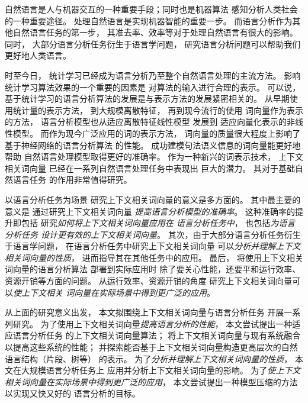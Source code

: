 自然语言是人与机器交互的一种重要手段；同时也是机器算法
感知分析人类社会的一种重要途径。
处理自然语言是实现机器智能的重要一步。
而语言分析作为其他自然语言任务的第一步，
其准去率、效率等对于处理自然语言有很大的影响。
同时，
大部分语言分析任务衍生于语言学问题，
研究语言分析问题可以帮助我们更好地人类语言。

时至今日，
统计学习已经成为语言分析乃至整个自然语言处理的主流方法。
影响统计学习算法效果的一个重要的因素是
对算法的输入进行合理的表示。
可以说，
基于统计学习的语言分析算法的发展是与表示方法的发展紧密相关的。
从早期使用统计量的表示方法\cite{Brown:1992:CNG:176313.176316,Brown:1993:MSM:972470.972474,Vogel:1996:HWA:993268.993313,eisner-1996-coling}，
到大规模离散特征\cite{collins:2002:EMNLP02,mcdonald2006online,daume05search,zhang-clark:cl:2011}，
再到现今流行的使用
词向量作为表示的方法\cite{DBLP:journals/corr/MikolovSCCD13,DBLP:journals/corr/HuangXY15,kim-rush:2016:EMNLP2016}，
语言分析模型也从适应离散特征线性模型\cite{NIPS2003_2397,Crammer:2006:OPA:1248547.1248566}
发展到
适应向量化表示的非线性模型\cite{hubel:monkey,Hochreiter:1997:LSM:1246443.1246450,Collobert:2011:NLP:1953048.2078186}。
而作为现今广泛应用的词的表示方法，
词向量的质量很大程度上影响了基于神经网络的语言分析算法
的性能。\cite{faruqui-EtAl:2016:RepEval,7478417,schnabel-EtAl:2015:EMNLP}
成功建模句法语义信息的词向量能更好地帮助
自然语言处理模型取得更好的准确率。
作为一种新兴的词表示技术，
上下文相关词向量
已经在一系列自然语言处理任务中表现出
巨大的潜力。
其对于基础自然语言任务
的作用非常值得研究。

以语言分析任务为场景
研究上下文相关词向量的意义是多方面的。
其中最主要的意义是
通过研究上下文相关词向量
\textit{提高语言分析模型的准确率}。
这种准确率的提升即包括
研究\textit{如何将上下文相关词向量应用在
语言分析任务中}，
也包括\textit{为语言分析任务
设计更有效的上下文相关词向量}。
其次，由于大部分语言分析任务衍生于语言学问题，
在语言分析任务中研究上下文相关词向量
可以\textit{分析并理解上下文相关词向量的性质}，
进而指导其在其他任务中的应用。
最后，
将使用上下文相关词向量的语言分析算法
部署到实际应用时
除了要关心性能，还要平和运行效率、资源开销等方面的问题。
从运行效率、资源开销的角度
研究上下文相关词向量可以\textit{使上下文相关
词向量在实际场景中得到更广泛的应用}。

从上面的研究意义出发，
本文拟围绕上下文相关词向量与语言分析任务
开展一系列研究。
为了使用上下文相关词向量\textit{提高语言分析的性能}，
本文尝试提出一种适应语言分析任务
的上下文相关词向量算法；
将上下文相关词向量与现有系统融合以提高这些系统的性能；
并探索能否基于上下文相关词向量构造更高层次的自然语言结构（片段、树等）
的表示。
为了\textit{分析并理解上下文相关词向量的性质}，
本文在大规模语言分析任务上
应用并分析上下文相关词向量的影响。
为了\textit{使上下文相关词向量在实际场景中得到更广泛的应用}，
本文尝试提出一种模型压缩的方法以实现又快又好的
语言分析的目标。

